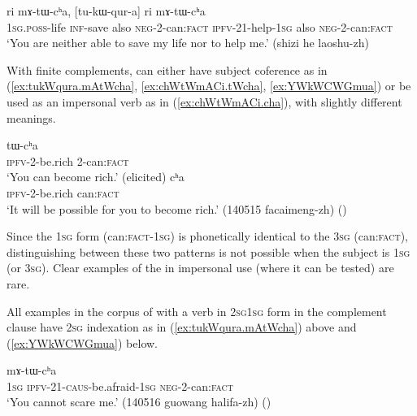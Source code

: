  \begin{exe}
\ex \label{ex:tukWqura.mAtWcha}
 \gll  [a-sroʁ kɤ-ri] ri mɤ-tɯ-cʰa, [tu-kɯ-qur-a] ri mɤ-tɯ-cʰa  \\
 \textsc{1sg}.\textsc{poss}-life \textsc{inf}-save also \textsc{neg}-2-can:\textsc{fact} \textsc{ipfv}-2\fl{}1-help-\textsc{1sg} also \textsc{neg}-2-can:\textsc{fact}  \\
 \glt `You are neither able to save my life nor to help me.' (shizi he laoshu-zh)
\end{exe}    

With finite complements,  can either have subject coference as in (\ref{ex:tukWqura.mAtWcha}, \ref{ex:chWtWmACi.tWcha}, \ref{ex:YWkWCWGmua}) or be used as an impersonal verb as in (\ref{ex:chWtWmACi.cha}), with slightly different meanings.
   
\begin{exe}
 \ex
\begin{xlist}
\ex \label{ex:chWtWmACi.tWcha}
  tɯ-cʰa \\
 \textsc{ipfv}-2-be.rich 2-can:\textsc{fact} \\
 \glt `You can become rich.' (elicited)
 \ex \label{ex:chWtWmACi.cha}
  cʰa \\
 \textsc{ipfv}-2-be.rich can:\textsc{fact} \\
 \glt `It will be possible for you to become rich.' (140515 facaimeng-zh)
 ()
\end{xlist}
\end{exe}
  
 Since the \textsc{1sg} form  (can:\textsc{fact}-\textsc{1sg}) is phonetically identical to the \textsc{3sg}  (can:\textsc{fact}), distinguishing between these two patterns is not possible when the subject is \textsc{1sg} (or \textsc{3sg}). Clear examples of the  in impersonal use (where it can be tested) are rare.
 
All examples in the corpus of  with a verb in \textsc{2sg}\fl{}\textsc{1sg} form in the complement clause have \textsc{2sg} indexation as in (\ref{ex:tukWqura.mAtWcha}) above and (\ref{ex:YWkWCWGmua}) below.

\begin{exe}
\ex \label{ex:YWkWCWGmua}
 mɤ-tɯ-cʰa  \\  
  \textsc{1sg} \textsc{ipfv}-2\fl{}1-\textsc{caus}-be.afraid-\textsc{1sg} \textsc{neg}-2-can:\textsc{fact} \\
\glt `You cannot scare me.' (140516 guowang halifa-zh)
()
  \end{exe}


